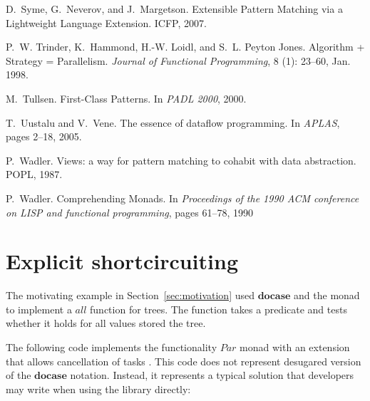 \documentclass{sigplanconf}
\newcommand{\Conid}[1]{\mathit{#1}}
\newcommand{\Varid}[1]{\mathit{#1}}
\begin{document}
\begin{thebibliography}{37}
D.~Syme, G.~Neverov, and J.~Margetson.
\newblock Extensible Pattern Matching via a Lightweight Language Extension.
\newblock ICFP, 2007.

P.~W. Trinder, K.~Hammond, H.-W. Loidl, and S.~L. {Peyton Jones}.
\newblock Algorithm + {S}trategy = {P}arallelism.
\newblock \emph{Journal of Functional Programming}, 8 (1):
  23--60, Jan. 1998.

M.~Tullsen.
\newblock First-Class Patterns.
\newblock In \emph{PADL 2000}, 2000.

T.~Uustalu and V.~Vene.
\newblock The essence of dataflow programming.
\newblock In \emph{APLAS}, pages 2--18, 2005.

P.~Wadler.
\newblock Views: a way for pattern matching to cohabit with data abstraction.
\newblock POPL, 1987.

P.~Wadler.
\newblock Comprehending Monads.
\newblock In \emph{Proceedings of the 1990 ACM conference on LISP and
  functional programming}, pages 61--78, 1990

\end{thebibliography}


\appendix

\section{Explicit shortcircuiting}
\label{sec:appendix-shortcircuit}
The motivating example in Section~\ref{sec:motivation} used \ensuremath{\mathbf{docase}} and the  monad to 
implement a \ensuremath{\Varid{all}} function for trees. The function takes a predicate and tests whether it holds 
for all values stored the tree. 

The following code implements the functionality \ensuremath{\Conid{Par}} monad with an extension that allows cancellation 
of tasks \cite{parmonad-cancellation}. This code does not represent desugared version of the \ensuremath{\mathbf{docase}} 
notation. Instead, it represents a typical solution that developers may write when using the library 
directly:
\end{document}
